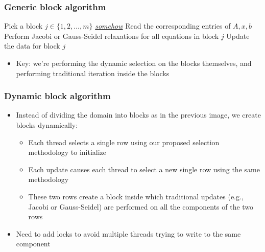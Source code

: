 \documentclass{beamer}
\begin{document}
\begin{frame}
	\frametitle{Generic block algorithm}
	\begin{algorithm}[H]
		\DontPrintSemicolon
		 {
			 {
				Pick a block $j \in \{1, 2, \ldots, m\}$ {\em{\underline{somehow}}} \; 
				Read the corresponding entries of $A, x, b$ \;
				Perform Jacobi or Gauss-Seidel relaxations for all equations in block $j$ \;
				Update the data for block $j$ \;
			}
		}
	\end{algorithm}
	\begin{itemize}
	    \item Key: we're performing the dynamic selection on the blocks themselves, and performing traditional iteration inside the blocks
	\end{itemize}
\end{frame}

\begin{frame}
	\frametitle{Dynamic block algorithm}
	\begin{itemize}
	    \item Instead of dividing the domain into blocks as in the previous image, we create blocks dynamically:
	        \begin{itemize}
	            \item Each thread selects a single row using our proposed selection methodology to initialize
	            \item Each update causes each thread to select a new single row using the same methodology
	            \item These two rows create a block inside which traditional updates (e.g., Jacobi or Gauss-Seidel) are performed on all the components of the two rows
	        \end{itemize}
        \item Need to add locks to avoid multiple threads trying to write to the same component
	\end{itemize}
\end{frame}
\end{document}
